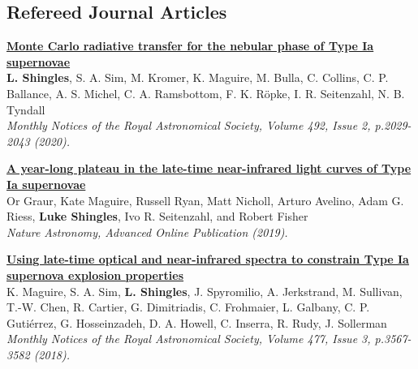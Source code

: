 \documentclass[11pt]{res} %
\newcommand{\highlight}[1]{\textbf{#1}}
\newcommand{\articletitle}[1]{{\textbf{\color{black} #1}}\\}
\newcommand{\articleauthors}[1]{#1\\}
\newcommand{\articlejournalref}[1]{\textit{#1}}
\begin{document}
\begin{resume}
\pagebreak
\begin{comment}
\section{Referees}
  \textbf{Dr. Stuart Sim}\\
  Lecturer, Centre for Astrophysics Research\\
  Queen's University Belfast, UK\\
  stuart.sim@anu.edu.au

  \textbf{Dr. Amanda Karakas}\\
  Lecturer, School of Physics & Astronomy\\
  Monash University, Australia\\
  amanda.karakas@monash.edu

  \textbf{Prof. Gary Da Costa}\\
  Professor, Research School of Astronomy \& Astrophysics\\
  Australian National University\\
  gary.dacosta@anu.edu.au
\end{comment}

\section{Refereed Journal Articles}

\articletitle{\href{https://ui.adsabs.harvard.edu/abs/2020MNRAS.492.2029S}{Monte Carlo radiative transfer for the nebular phase of Type Ia supernovae}}
\articleauthors{\highlight{L. Shingles}, S. A. Sim, M. Kromer, K. Maguire, M. Bulla, C. Collins, C. P. Ballance, A. S. Michel, C. A. Ramsbottom, F. K. R\"opke, I. R. Seitenzahl, N. B. Tyndall}
\articlejournalref{Monthly Notices of the Royal Astronomical Society, Volume 492, Issue 2, p.2029-2043 (2020).}

\articletitle{\href{https://ui.adsabs.harvard.edu/abs/2019NatAs.tmp..463G}{A year-long plateau in the late-time near-infrared light curves of Type Ia supernovae}}
\articleauthors{Or Graur, Kate Maguire, Russell Ryan, Matt Nicholl, Arturo Avelino, Adam G. Riess, \highlight{Luke Shingles}, Ivo R. Seitenzahl, and Robert Fisher}
\articlejournalref{Nature Astronomy, Advanced Online Publication (2019).}

\articletitle{\href{http://adsabs.harvard.edu/abs/2018MNRAS.477.3567M}{Using late-time optical and near-infrared spectra to constrain Type Ia supernova explosion properties}}
\articleauthors{K. Maguire, S. A. Sim, \highlight{L. Shingles}, J. Spyromilio, A. Jerkstrand, M. Sullivan, T.-W. Chen, R. Cartier, G. Dimitriadis, C. Frohmaier, L. Galbany, C. P. Gutiérrez, G. Hosseinzadeh, D. A. Howell, C. Inserra, R. Rudy, J. Sollerman}
\articlejournalref{Monthly Notices of the Royal Astronomical Society, Volume 477, Issue 3, p.3567-3582 (2018).}


\end{resume}
\end{document}
